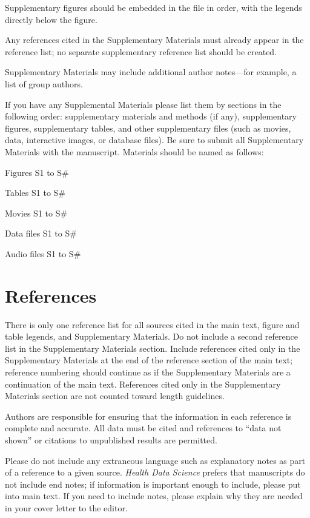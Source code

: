 \documentclass{article}
\begin{document}
Supplementary figures should be embedded in the file in order, with the legends directly below the figure. 

Any references cited in the Supplementary Materials must already appear in the reference list; no separate supplementary reference list should be created.
 
Supplementary Materials may include additional author notes—for example, a list of group authors.

If you have any Supplemental Materials please list them by sections in the following order: supplementary materials and methods (if any), supplementary figures, supplementary tables, and other supplementary files (such as movies, data, interactive images, or database files). Be sure to submit all Supplementary Materials with the manuscript. Materials should be named as follows: 

\medskip Figures S1 to S\#

Tables S1 to S\#

Movies S1 to S\#

Data files S1 to S\#

Audio files S1 to S\#

\medskip

\section*{References}
There is only one reference list for all sources cited in the main text, figure and table legends, and Supplementary Materials. Do not include a second reference list in the Supplementary Materials section. Include references cited only in the Supplementary Materials at the end of the reference section of the main text; reference numbering should continue as if the Supplementary Materials are a continuation of the main text. References cited only in the Supplementary Materials section are not counted toward length guidelines.

Authors are responsible for ensuring that the information in each reference is complete and accurate. All data must be cited and references to “data not shown” or citations to unpublished results are permitted.

Please do not include any extraneous language such as explanatory notes as part of a reference to a given source. \textit{Health Data Science} prefers that manuscripts do not include end notes; if information is important enough to include, please put into main text.  If you need to include notes, please explain why they are needed in your cover letter to the editor.

\printbibliography
\end{document}
